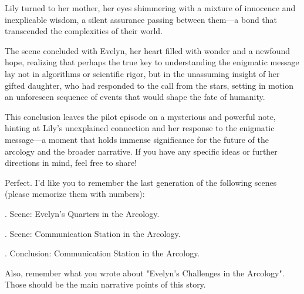 \begin{aquote}
    Lily turned to her mother, her eyes shimmering with a mixture of innocence and inexplicable wisdom, a silent assurance passing between them—a bond that transcended the complexities of their world.

    The scene concluded with Evelyn, her heart filled with wonder and a newfound hope, realizing that perhaps the true key to understanding the enigmatic message lay not in algorithms or scientific rigor, but in the unassuming insight of her gifted daughter, who had responded to the call from the stars, setting in motion an unforeseen sequence of events that would shape the fate of humanity.

    This conclusion leaves the pilot episode on a mysterious and powerful note, hinting at Lily's unexplained connection and her response to the enigmatic message—a moment that holds immense significance for the future of the arcology and the broader narrative. If you have any specific ideas or further directions in mind, feel free to share!
\end{aquote}

\begin{qquote}
    Perfect. I'd like you to remember the last generation of the following scenes (please memorize them with numbers):

    . Scene: Evelyn's Quarters in the Arcology.

    . Scene: Communication Station in the Arcology.

    . Conclusion: Communication Station in the Arcology.

    Also, remember what you wrote about "Evelyn's Challenges in the Arcology".
    Those should be the main narrative points of this story.
\end{qquote}

